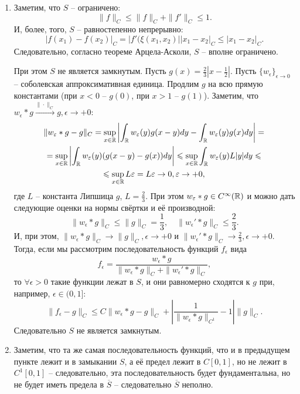 \begin{solve}
    \leavevmode
    \begin{enumerate}
        \item Заметим, что $S$ -- ограничено:
        \[
            \|f\|_C \leq \|f\|_C + \|f'\|_C \leq 1.
        \]
        И, более, того, $S$ -- равностепенно непрерывно:
        \[
            |f(x_1) - f(x_2)|_C = |f'(\xi(x_1, x_2)||x_1 - x_2|_C \leq |x_1 - x_2|_C.
        \]
        Следовательно, согласно теореме Арцела-Асколи, $S$ -- вполне ограничено.

        При этом $S$ не является замкнутым. Пусть $g(x) = \frac{2}{3}\left|x - \frac{1}{2}\right|$. Пусть $\{w_\epsilon\}_{\epsilon \rightarrow 0}$ -- соболевская аппроксимативная единица. Продлим $g$ на всю прямую константами (при $x < 0$ -- $g(0)$, при $x > 1$ -- $g(1)$). Заметим, что $w_\epsilon * g \xrightarrow{\|\cdot\|_C} g, \epsilon \rightarrow +0\colon$
        \begin{multline*}
            \|w_{\varepsilon} * g - g\|_C = \sup\limits_{x \in \mathbb{R}} \left|\int_{\mathbb{R}} w_{\varepsilon}(y)g(x - y)dy - \int_{\mathbb{R}} w_{\varepsilon}(y)g(x)dy\right| = \\
            = \sup\limits_{x \in \mathbb{R}}\left|\int_{\mathbb{R}} w_{\varepsilon}(y)(g(x - y) - g(x))dy\right| \leqslant \sup\limits_{x \in \mathbb{R}} \int_{\mathbb{R}} w_{\varepsilon}(y)L|y|dy \leqslant \\ \leqslant  \sup_{x \in \mathbb{R}} L\varepsilon = L\varepsilon \rightarrow 0, \varepsilon \rightarrow +0,
        \end{multline*}
        где $L$ -- константа Липшица $g$, $L = \frac{2}{3}$. При этом $w_{\varepsilon} * g \in C^{\infty}(\mathbb{R})$ и можно дать следующие оценки на нормы свёртки и её производной:
        \[
            \|w_\epsilon * g\|_C \leq \|g\|_C = \frac{1}{3}, \quad \|w_\epsilon' * g\|_C \leq \frac{2}{3}.
        \]
        И, при этом, $\|w_\epsilon * g\|_C \rightarrow \|g\|_C, \epsilon \rightarrow +0$ и $\|w_\epsilon' * g\|_C \rightarrow \frac{2}{3}, \epsilon \rightarrow +0$. Тогда, если мы рассмотрим последовательность функций $f_\epsilon$ вида
        \[
            f_\epsilon = \frac{w_\epsilon * g}{\|w_\epsilon * g\|_C + \|w_\epsilon' * g\|_C},
        \]
        то $\forall \epsilon > 0$ такие функции лежат в $S$, и они равномерно сходятся к $g$ при, например, $\epsilon \in (0, 1]\colon$
        \[
            \|f_\epsilon - g\|_C \leq C\|w_\epsilon * g - g\|_C + \left|\frac{1}{\|w_\epsilon * g\|_{C^1}} - 1\right|\|g\|_C.
        \]
        Следовательно $S$ не является замкнутым.
        \item Заметим, что та же самая последовательность функций, что и в предыдущем пункте лежит и в замыкании $S$, а её предел лежит в $C[0, 1]$, но не лежит в $C^1[0, 1]$ -- следовательно, эта последовательность будет фундаментальна, но не будет иметь предела в $\overline{S}$ -- следовательно $\overline{S}$ неполно.


\end{enumerate}
\end{solve}
